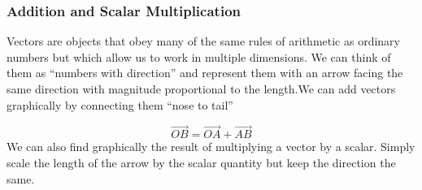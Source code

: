 \documentclass[11pt,titlepage]{article}
\numberwithin{equation}{subsection}
\begin{document}
\subsubsection{Addition and Scalar Multiplication}
Vectors are objects that obey many of the same rules of arithmetic as ordinary numbers but which allow us to work in multiple dimensions. We can think of them as “numbers with direction” and represent them with an arrow facing the same direction with magnitude proportional to the length.We can add vectors graphically by connecting them “nose to tail”
\begin{tcolorbox}
\centering
{}
\end{tcolorbox}
\begin{equation}
    \overrightarrow{OB}=\overrightarrow{OA}+\overrightarrow{AB}
\end{equation}
We can also find graphically the result of multiplying a vector by a scalar. Simply scale the
length of the arrow by the scalar quantity but keep the direction the same.
\begin{tcolorbox}
    \centering
{}
\end{tcolorbox}
\end{document}
